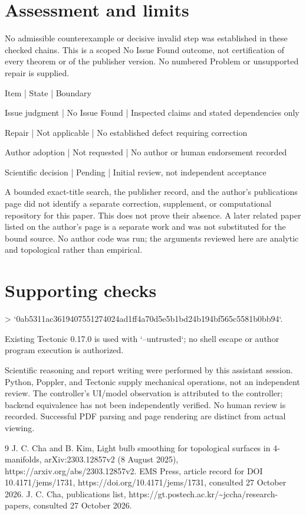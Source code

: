 \documentclass[10pt]{article}
\begin{document}
\section*{Assessment and limits}
No admissible counterexample or decisive invalid step was established in these checked chains. This is a scoped No Issue Found outcome, not certification of every theorem or of the publisher version. No numbered Problem or unsupported repair is supplied.\par
Item | State | Boundary\par
Issue judgment | No Issue Found | Inspected claims and stated dependencies only\par
Repair | Not applicable | No established defect requiring correction\par
Author adoption | Not requested | No author or human endorsement recorded\par
Scientific decision | Pending | Initial review, not independent acceptance\par
A bounded exact-title search, the publisher record, and the author’s publications page did not identify a separate correction, supplement, or computational repository for this paper. This does not prove their absence. A later related paper listed on the author’s page is a separate work and was not substituted for the bound source. No author code was run; the arguments reviewed here are analytic and topological rather than empirical.\par
\section*{Supporting checks}
> `0ab5311ac3619407551274024ad1ff4a70d5e5b1bd24b194bf565c5581b0bb94`.\par
Existing Tectonic 0.17.0 is used with `–untrusted`; no shell escape or author program execution is authorized.\par
Scientific reasoning and report writing were performed by this assistant session. Python, Poppler, and Tectonic supply mechanical operations, not an independent review. The controller’s UI/model observation is attributed to the controller; backend equivalence has not been independently verified. No human review is recorded. Successful PDF parsing and page rendering are distinct from actual viewing.\par
9 J. C. Cha and B. Kim, Light bulb smoothing for topological surfaces in 4-manifolds, arXiv:2303.12857v2 (8 August 2025), https://arxiv.org/abs/2303.12857v2. EMS Press, article record for DOI 10.4171/jems/1731, https://doi.org/10.4171/jems/1731, consulted 27 October 2026. J. C. Cha, publications list, https://gt.postech.ac.kr/\textasciitilde{}jccha/research-papers, consulted 27 October 2026.\par
\end{document}
